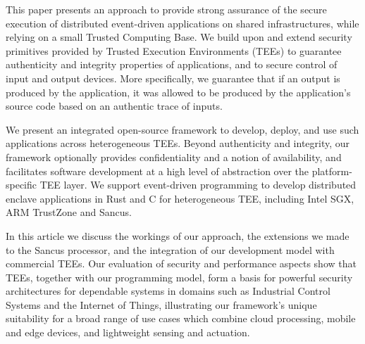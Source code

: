 This paper presents an approach to provide strong assurance of the secure
execution of distributed event-driven applications on shared
infrastructures, while relying on a small Trusted Computing Base. We build
upon and extend security primitives provided by Trusted Execution
Environments (TEEs) to guarantee authenticity and integrity properties of
applications, and to secure control of input and output devices.  More
specifically, we guarantee that if an output is produced by the
application, it was allowed to be produced by the application's source code
based on an authentic trace of inputs.

We present an integrated open-source framework to develop, deploy, and use
such applications across heterogeneous TEEs.  Beyond authenticity and
integrity, our framework optionally provides confidentiality and a notion
of availability, and facilitates software development at a high level of
abstraction over the platform-specific TEE layer. We support event-driven
programming to develop distributed enclave applications in Rust and C for
heterogeneous TEE, including Intel SGX, ARM TrustZone and Sancus.

In this article we discuss the workings of our approach, the extensions we made
to the Sancus processor, and the integration of our development model with
commercial TEEs. Our evaluation of security and performance aspects show that
TEEs, together with our programming model, form a basis for powerful security
architectures for dependable systems in domains such as Industrial Control
Systems and the Internet of Things, illustrating our framework's unique
suitability for a broad range of use cases which combine cloud processing,
mobile and edge devices, and lightweight sensing and actuation.

